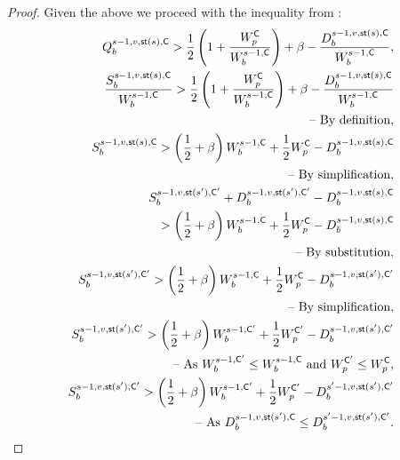 \documentclass{article}
\begin{document}
\begin{proof}
    Given the above we proceed with the inequality from :
    \begin{align*}
        Q^{s-1, v, \mathsf{st}(s), \mathsf{C}}_{b} > \frac{1}{2}\left(1 + \frac{W^{\mathsf{C}}_p}{W^{s-1, \mathsf{C}}_b}\right) + \beta - \frac{D^{s-1, v, \mathsf{st}(s), \mathsf{C}}_b}{W^{s-1, \mathsf{C}}_b},\\
        \frac{S^{s-1, v, \mathsf{st}(s), \mathsf{C}}_{b}}{W^{s-1, \mathsf{C}}_{b}} > \frac{1}{2}\left(1 + \frac{W^{\mathsf{C}}_p}{W^{s-1, \mathsf{C}}_b}\right) + \beta - \frac{D^{s-1, v, \mathsf{st}(s), \mathsf{C}}_b}{W^{s-1, \mathsf{C}}_b}\\ \text{-- By definition},\\
        S^{s-1, v, \mathsf{st}(s), \mathsf{C}}_{b} > \left(\frac{1}{2} + \beta\right){W^{s-1, \mathsf{C}}_b} + \frac{1}{2} W^{\mathsf{C}}_p - D^{s-1, v, \mathsf{st}(s), \mathsf{C}}_b\\ \text{-- By simplification},\\
        S^{s-1, v, \mathsf{st}(s'), \mathsf{C}'}_{b} + D^{s-1, v, \mathsf{st}(s'), \mathsf{C}'}_{b}-D^{s-1, v, \mathsf{st}(s), \mathsf{C}}_{b}\\ > \left(\frac{1}{2} + \beta\right){W^{s-1, \mathsf{C}}_b} + \frac{1}{2} W^{\mathsf{C}}_p - D^{s-1, v, \mathsf{st}(s), \mathsf{C}}_b\\ \text{-- By substitution},\\
        S^{s-1, v, \mathsf{st}(s'), \mathsf{C}'}_{b} > \left(\frac{1}{2} + \beta\right){W^{s-1, \mathsf{C}}_b} + \frac{1}{2} W^{\mathsf{C}}_p - D^{s-1, v, \mathsf{st}(s'), \mathsf{C}'}_b\\ \text{-- By simplification},\\
        S^{s-1, v, \mathsf{st}(s'), \mathsf{C}'}_{b} > \left(\frac{1}{2} + \beta\right){W^{s-1, \mathsf{C}'}_b} + \frac{1}{2} W^{\mathsf{C}'}_p - D^{s-1, v, \mathsf{st}(s'), \mathsf{C}'}_b\\ \text{-- As } W^{s-1,\mathsf{C}'}_b \leq W^{s-1,\mathsf{C}}_b \text{ and } W^{\mathsf{C}'}_p \leq W^{\mathsf{C}}_p,\\
        S^{s-1, v, \mathsf{st}(s'), \mathsf{C}'}_{b} > \left(\frac{1}{2} + \beta\right){W^{s-1, \mathsf{C}'}_b} + \frac{1}{2} W^{\mathsf{C}'}_p - D^{s'-1, v, \mathsf{st}(s'), \mathsf{C}'}_b\\ \text{-- As } D^{s-1, v, \mathsf{st}(s'), \mathsf{C}}_{b} \leq D^{s'-1, v, \mathsf{st}(s'), \mathsf{C}'}_{b}.\\
    \end{align*}
    

\end{proof}
\end{document}
